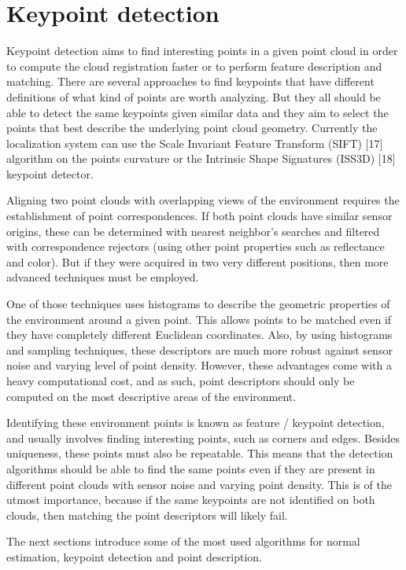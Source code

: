 \section{Keypoint detection}

Keypoint detection aims to find interesting points in a given point cloud in order to compute the cloud registration faster or to perform feature description and matching. There are several approaches to find keypoints that have different definitions of what kind of points are worth analyzing. But they all should be able to detect the same keypoints given similar data and they aim to select the points that best describe the underlying point cloud geometry. Currently the localization system can use the Scale Invariant Feature Transform (SIFT) [17] algorithm on the points curvature or the Intrinsic Shape Signatures (ISS3D) [18] keypoint detector.


Aligning two point clouds with overlapping views of the environment requires the establishment of point correspondences. If both point clouds have similar sensor origins, these can be determined with nearest neighbor's searches and filtered with correspondence rejectors (using other point properties such as reflectance and color). But if they were acquired in two very different positions, then more advanced techniques must be employed.

One of those techniques uses histograms to describe the geometric properties of the environment around a given point. This allows points to be matched even if they have completely different Euclidean coordinates. Also, by using histograms and sampling techniques, these descriptors are much more robust against sensor noise and varying level of point density. However, these advantages come with a heavy computational cost, and as such, point descriptors should only be computed on the most descriptive areas of the environment.

Identifying these environment points is known as feature / keypoint detection, and usually involves finding interesting points, such as corners and edges. Besides uniqueness, these points must also be repeatable. This means that the detection algorithms should be able to find the same points even if they are present in different point clouds with sensor noise and varying point density. This is of the utmost importance, because if the same keypoints are not identified on both clouds, then matching the point descriptors will likely fail.

The next sections introduce some of the most used algorithms for normal estimation, keypoint detection and point description.


